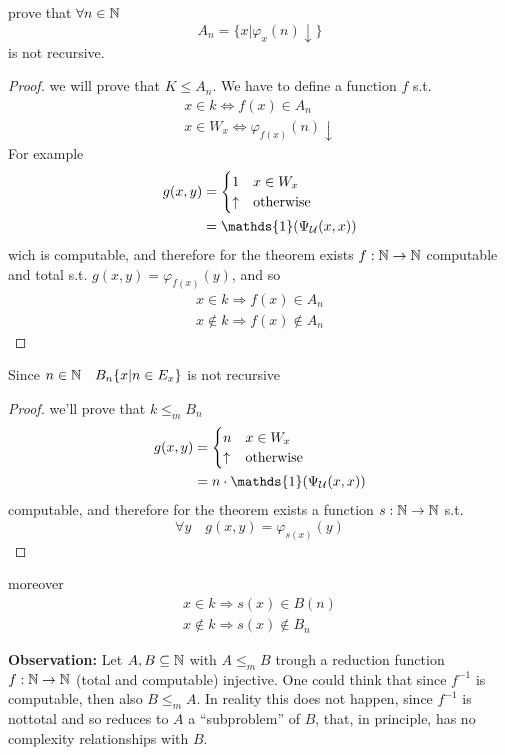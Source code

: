 \begin{example}
  prove that $\forall n \in \mathbb{N}$
  \[
    A_n = \{x  | \varphi_x (n) \downarrow\}
  \]
  is not recursive.

  \begin{proof}
    we will prove that $K \leq A_n$. We have to define a function $f$
    s.t.
    \begin{gather*}
      x \in k \Leftrightarrow f(x) \in A_n \\
      x \in W_x \Leftrightarrow \varphi_{f(x)}(n) \downarrow
    \end{gather*}
    For example
    \[
      \begin{split}
        g(x,y) &= \begin{cases}
          1 & x \in W_x \\
          \uparrow & \mbox{otherwise}
        \end{cases} \\
        &= \mathds{1}(\univ(x,x))
      \end{split}
    \]
    wich is computable, and therefore for the \smn theorem exists
    $f: \mathbb{N} \rightarrow \mathbb{N}$ computable and total s.t.
    $g(x,y) = \varphi_{f(x)}(y)$, and so
    \begin{gather*}
      x \in k \Rightarrow f(x) \in A_n \\
      x \notin  k \Rightarrow f(x) \notin A_n
    \end{gather*}
  \end{proof}
\end{example}

\begin{example}
  Since $n \in \mathbb{N} \quad B_n\{ x | n \in E_x\}$ is not recursive
  \begin{proof}
    we'll prove that $k \leq_m B_n$
    \[
      \begin{split}
        g(x,y) &= \begin{cases}
          n & x \in W_x \\
          \uparrow & \mbox{otherwise}
        \end{cases} \\
        &= n \cdot \mathds{1}(\univ(x,x))
      \end{split}
    \]
    computable, and therefore for the \smn theorem exists a function
    $s : \mathbb{N} \rightarrow \mathbb{N}$ s.t.
    \[
      \forall y \quad g(x,y) = \varphi_{s(x)}(y)
    \]
  \end{proof}
  moreover
  \begin{gather*}
    x \in k \Rightarrow s(x) \in B(n) \\
    x \notin k \Rightarrow s(x) \notin B_n
  \end{gather*}
\end{example}

\textbf{Observation:} Let $A,B \subseteq \mathbb{N}$ with $A \leq_m B$
trough a reduction function $f : \mathbb{N} \rightarrow \mathbb{N}$ (total and computable)
injective. One could think that since $f^{-1}$ is computable, then
also $B \leq_m A$. In reality this does not happen, since $f^{-1}$ is
nottotal and so reduces to $A$ a ``subproblem'' of $B$, that, in
principle, has no complexity relationships with $B$.
